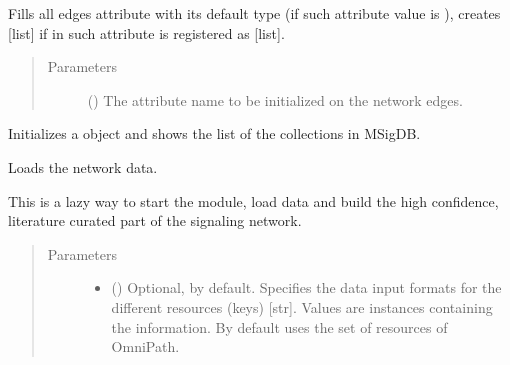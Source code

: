 \documentclass[letterpaper,10pt,english]{sphinxmanual}
\begin{document}
\begin{fulllineitems}
\begin{fulllineitems}
\label{\detokenize{reference:pypath.main.PyPath.init_edge_attr}}
Fills all edges attribute  with its default type (if
such attribute value is ), creates {[}list{]} if in
 such attribute is
registered as {[}list{]}.
\begin{quote}\begin{description}
\item[{Parameters}] \leavevmode
{} () \textendash{} The attribute name to be initialized on the network edges.

\end{description}\end{quote}

\end{fulllineitems}


\begin{fulllineitems}
\label{\detokenize{reference:pypath.main.PyPath.init_gsea}}
Initializes a  object and shows the list of the
collections in MSigDB.

\end{fulllineitems}


\begin{fulllineitems}
\label{\detokenize{reference:pypath.main.PyPath.init_network}}
Loads the network data.

This is a lazy way to start the module, load data and build the
high confidence, literature curated part of the signaling
network.
\begin{quote}\begin{description}
\item[{Parameters}] \leavevmode\begin{itemize}
\item {} 
 () \textendash{} Optional,  by default. Specifies the data input
formats for the different resources (keys) {[}str{]}. Values
are  instances
containing the information. By default uses the set of
resources of OmniPath.


\end{itemize}
\end{description}
\end{quote}
\end{fulllineitems}
\end{fulllineitems}
\end{document}
